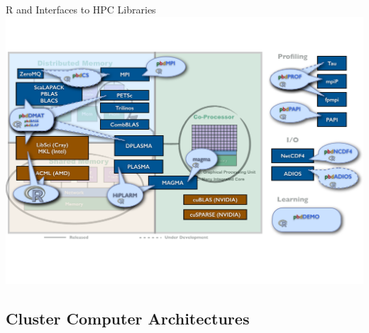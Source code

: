 \begin{frame}{R and \pbdR Interfaces to HPC Libraries}
\includegraphics[height=\textheight]
{../common/pics/hardware/ParallelHardware26.pdf}
\end{frame}


\subsection{Cluster Computer Architectures}
\makesubcontentsslidessec

